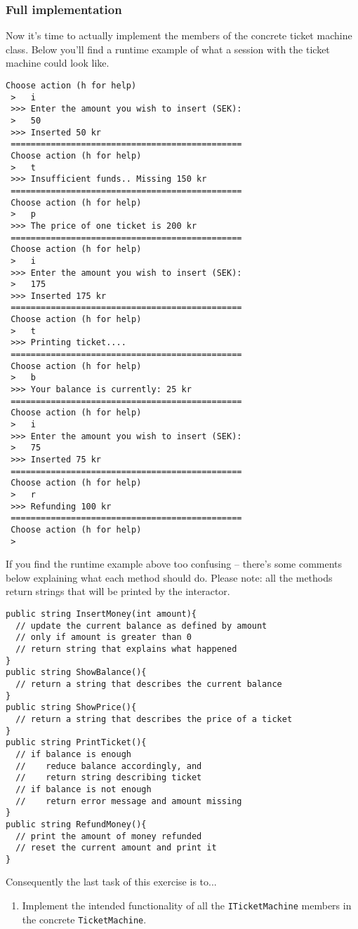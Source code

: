 \documentclass{article}
\newcounter{stepcounter}
\newenvironment{steps}{ 
  \begin{enumerate}[label=\color{red}Step \thesection-\theenumi)]
    \setcounter{enumi}{\value{stepcounter}}
}{
  \setcounter{stepcounter}{\value{enumi}}
  \end{enumerate}
}
\begin{document}
\subsubsection{Full implementation}
Now it's time to actually implement the members of the concrete ticket machine class. Below you'll find a runtime example of what a session with the ticket machine could look like.
\begin{lstlisting}[style=terminal]
 Choose action (h for help)
 >   i
 >>> Enter the amount you wish to insert (SEK):
 >   50
 >>> Inserted 50 kr
 ==============================================
 Choose action (h for help)
 >   t
 >>> Insufficient funds.. Missing 150 kr
 ==============================================
 Choose action (h for help)
 >   p
 >>> The price of one ticket is 200 kr
 ==============================================
 Choose action (h for help)
 >   i
 >>> Enter the amount you wish to insert (SEK):
 >   175
 >>> Inserted 175 kr
 ==============================================
 Choose action (h for help)
 >   t
 >>> Printing ticket....
 ==============================================
 Choose action (h for help)
 >   b
 >>> Your balance is currently: 25 kr
 ==============================================
 Choose action (h for help)
 >   i
 >>> Enter the amount you wish to insert (SEK):
 >   75
 >>> Inserted 75 kr
 ==============================================
 Choose action (h for help)
 >   r
 >>> Refunding 100 kr
 ==============================================
 Choose action (h for help)
 >
\end{lstlisting}
If you find the runtime example above too confusing -- there's some comments below explaining what each method should do. Please note: all the methods return strings that will be printed by the interactor.

\begin{lstlisting}
public string InsertMoney(int amount){
  // update the current balance as defined by amount
  // only if amount is greater than 0
  // return string that explains what happened
}
public string ShowBalance(){
  // return a string that describes the current balance
}
public string ShowPrice(){
  // return a string that describes the price of a ticket
}
public string PrintTicket(){
  // if balance is enough
  //    reduce balance accordingly, and
  //    return string describing ticket
  // if balance is not enough
  //    return error message and amount missing
}
public string RefundMoney(){
  // print the amount of money refunded
  // reset the current amount and print it
}
\end{lstlisting}
Consequently the last task of this exercise is to...
\begin{steps}
\item Implement the intended functionality of all the \texttt{ITicketMachine} members in the concrete \texttt{TicketMachine}.
\end{steps}
\end{document}
